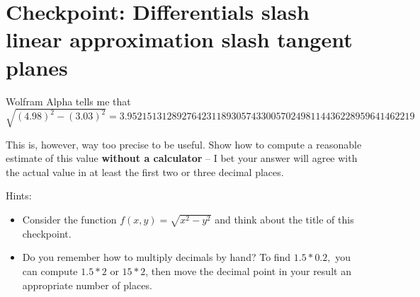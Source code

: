 


%


\allowdisplaybreaks
\section{Checkpoint: Differentials slash linear approximation slash tangent planes }
Wolfram Alpha tells me that $\sqrt{(4.98)^2 - (3.03)^2} = 3.9521513128927642311893057433005702498114436228959641462219$

This is, however, way too precise to be useful. Show how to compute a reasonable estimate of this value \textbf{without a calculator} -- I bet your answer will agree with the actual value in at least the first two or three decimal places.

Hints: 
\begin{itemize} 
    \item Consider the function $f(x,y) = \sqrt{x^2 - y^2}$ and think about the title of this checkpoint.
    \item Do you remember how to multiply decimals by hand? To find $1.5 \ast 0.2,$ you can compute $1.5 \ast 2$ or $15 \ast 2$, then move the decimal point in your result an appropriate number of places.
\end{itemize}
	
